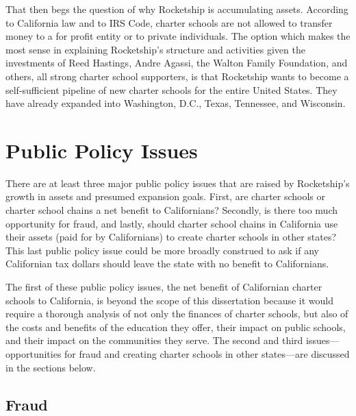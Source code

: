 That then begs the question of why Rocketship is accumulating assets. According to California law and to IRS Code, charter schools are not allowed to transfer money to a for profit entity or to private individuals. The option which makes the most sense in explaining Rocketship's structure and activities given the investments of Reed Hastings, Andre Agassi, the Walton Family Foundation, and others, all strong charter school supporters, is that Rocketship wants to become a self-sufficient pipeline of new charter schools for the entire United States. They have already expanded into Washington, D.C., Texas, Tennessee, and Wisconsin.

\section{Public Policy Issues}%
\label{sec:publ-policy-chang}\indent%

There are at least three major public policy issues that are raised by Rocketship's growth in assets and presumed expansion goals. First, are charter schools or charter school chains a net benefit to Californians? Secondly, is there too much opportunity for fraud, and lastly, should charter school chains in California use their assets (paid for by Californians) to create charter schools in other states? This last public policy issue could be more broadly construed to ask if any Californian tax dollars should leave the state with no benefit to Californians.

The first of these public policy issues, the net benefit of Californian charter schools to California, is beyond the scope of this dissertation because it would require a thorough analysis of not only the finances of charter schools, but also of the costs and benefits of the education they offer, their impact on public schools, and their impact on the communities they serve. The second and third issues—opportunities for fraud and creating charter schools in other states—are discussed in the sections below.

\subsection{Fraud}%
\label{sec:fraud}\indent%

